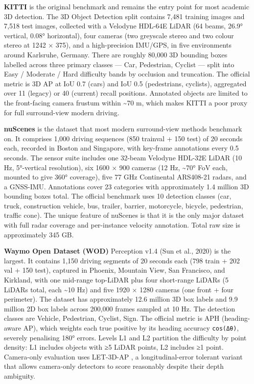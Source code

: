 \documentclass{article}
\begin{document}
\textbf{KITTI} \citep{geiger2012arewereadyforauton} is the original benchmark and remains the entry point for most academic 3D detection. The 3D Object Detection split contains 7,481 training images and 7,518 test images, collected with a Velodyne HDL-64E LiDAR (64 beams, 26.9° vertical, 0.08° horizontal), four cameras (two greyscale stereo and two colour stereo at 1242 × 375), and a high-precision IMU/GPS, in five environments around Karlsruhe, Germany. There are roughly 80,000 3D bounding boxes labelled across three primary classes --- Car, Pedestrian, Cyclist --- split into Easy / Moderate / Hard difficulty bands by occlusion and truncation. The official metric is 3D AP at IoU 0.7 (cars) and IoU 0.5 (pedestrians, cyclists), aggregated over 11 (legacy) or 40 (current) recall positions. Annotated objects are limited to the front-facing camera frustum within \textasciitilde70 m, which makes KITTI a poor proxy for full surround-view modern driving.

\textbf{nuScenes} \citep{caesar2020nuscenesamultimoda} is the dataset that most modern surround-view methods benchmark on. It comprises 1,000 driving sequences (850 trainval + 150 test) of 20 seconds each, recorded in Boston and Singapore, with key-frame annotations every 0.5 seconds. The sensor suite includes one 32-beam Velodyne HDL-32E LiDAR (10 Hz, 5°-vertical resolution), six 1600 × 900 cameras (12 Hz, \textasciitilde70° FoV each, mounted to give 360° coverage), five 77 GHz Continental ARS408-21 radars, and a GNSS-IMU. Annotations cover 23 categories with approximately 1.4 million 3D bounding boxes total. The official benchmark uses 10 detection classes (car, truck, construction vehicle, bus, trailer, barrier, motorcycle, bicycle, pedestrian, traffic cone). The unique feature of nuScenes is that it is the only major dataset with full radar coverage and per-instance velocity annotation. Total raw size is approximately 345 GB.

\textbf{Waymo Open Dataset (WOD)} Perception v1.4 (Sun et al., 2020) is the largest. It contains 1,150 driving segments of 20 seconds each (798 train + 202 val + 150 test), captured in Phoenix, Mountain View, San Francisco, and Kirkland, with one mid-range top-LiDAR plus four short-range LiDARs (5 LiDARs total, each \textasciitilde10 Hz) and five 1920 × 1280 cameras (one front + four perimeter). The dataset has approximately 12.6 million 3D box labels and 9.9 million 2D box labels across 200,000 frames sampled at 10 Hz. The detection classes are Vehicle, Pedestrian, Cyclist, Sign. The official metric is APH (heading-aware AP), which weights each true positive by its heading accuracy \texttt{\textbar{}cos(Δθ)\textbar{}}, severely penalising 180° errors. Levels L1 and L2 partition the difficulty by point density: L1 includes objects with ≥5 LiDAR points, L2 includes ≥1 point. Camera-only evaluation uses LET-3D-AP \citep{hung2022let3daplongitudina}, a longitudinal-error tolerant variant that allows camera-only detectors to score reasonably despite their depth ambiguity.
\end{document}
